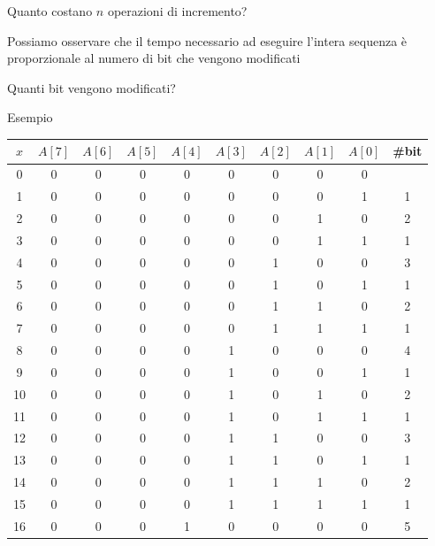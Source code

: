 \begin{frame}{Quanto costano $n$ operazioni di incremento?}
\begin{myboxtitle}
\BI
\item Possiamo osservare che il tempo necessario ad eseguire l’intera sequenza è proporzionale al numero di bit che vengono modificati
\item Quanti bit vengono modificati?
\EI
\end{myboxtitle}

\end{frame}

\begin{frame}{Esempio}
	
\vspace{-6pt}
\small
\begin{tabular}{ccccccccc|c}
 $x$  &  $A[7]$ & $A[6]$ & $A[5]$ & $A[4]$ & $A[3]$ & $A[2]$ & $A[1]$ & $A[0]$ & \#bit \\\hline
 0 & 0 & 0 & 0 & 0 & 0 & 0 & 0 & 0 \\
 1 & 0 & 0 & 0 & 0 & 0 & 0 & 0 & \alert{1} & 1 \\
 2 & 0 & 0 & 0 & 0 & 0 & 0 & \alert{1} & \alert{0} & 2 \\
 3 & 0 & 0 & 0 & 0 & 0 & 0 & 1 & \alert{1} & 1 \\
 4 & 0 & 0 & 0 & 0 & 0 & \alert{1} & \alert{0} & \alert{0} & 3 \\
 5 & 0 & 0 & 0 & 0 & 0 & 1 & 0 & \alert{1} & 1 \\
 6 & 0 & 0 & 0 & 0 & 0 & 1 & \alert{1} & \alert{0} & 2 \\
 7 & 0 & 0 & 0 & 0 & 0 & 1 & 1 & \alert{1} & 1 \\
 8 & 0 & 0 & 0 & 0 & \alert{1} & \alert{0} & \alert{0} & \alert{0} & 4 \\
 9 & 0 & 0 & 0 & 0 & 1 & 0 & 0 & \alert{1} & 1 \\
10 & 0 & 0 & 0 & 0 & 1 & 0 & \alert{1} & \alert{0} & 2 \\
11 & 0 & 0 & 0 & 0 & 1 & 0 & 1 & \alert{1} & 1 \\
12 & 0 & 0 & 0 & 0 & 1 & \alert{1} & \alert{0} & \alert{0} & 3 \\
13 & 0 & 0 & 0 & 0 & 1 & 1 & 0 & \alert{1} & 1 \\
14 & 0 & 0 & 0 & 0 & 1 & 1 & \alert{1} & \alert{0} & 2 \\
15 & 0 & 0 & 0 & 0 & 1 & 1 & 1 & \alert{1} & 1 \\
16 & 0 & 0 & 0 & \alert{1} & \alert{0} & \alert{0} & \alert{0} & \alert{0} & 5 \\
\end{tabular}    
    
\end{frame}	

